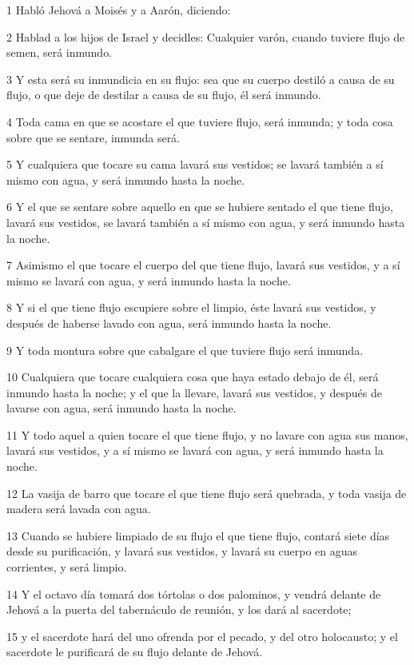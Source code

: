 \par 1 Habló Jehová a Moisés y a Aarón, diciendo:
\par 2 Hablad a los hijos de Israel y decidles: Cualquier varón, cuando tuviere flujo de semen, será inmundo.
\par 3 Y esta será su inmundicia en su flujo: sea que su cuerpo destiló a causa de su flujo, o que deje de destilar a causa de su flujo, él será inmundo.
\par 4 Toda cama en que se acostare el que tuviere flujo, será inmunda; y toda cosa sobre que se sentare, inmunda será.
\par 5 Y cualquiera que tocare su cama lavará sus vestidos; se lavará también a sí mismo con agua, y será inmundo hasta la noche.
\par 6 Y el que se sentare sobre aquello en que se hubiere sentado el que tiene flujo, lavará sus vestidos, se lavará también a sí mismo con agua, y será inmundo hasta la noche.
\par 7 Asimismo el que tocare el cuerpo del que tiene flujo, lavará sus vestidos, y a sí mismo se lavará con agua, y será inmundo hasta la noche.
\par 8 Y si el que tiene flujo escupiere sobre el limpio, éste lavará sus vestidos, y después de haberse lavado con agua, será inmundo hasta la noche.
\par 9 Y toda montura sobre que cabalgare el que tuviere flujo será inmunda.
\par 10 Cualquiera que tocare cualquiera cosa que haya estado debajo de él, será inmundo hasta la noche; y el que la llevare, lavará sus vestidos, y después de lavarse con agua, será inmundo hasta la noche.
\par 11 Y todo aquel a quien tocare el que tiene flujo, y no lavare con agua sus manos, lavará sus vestidos, y a sí mismo se lavará con agua, y será inmundo hasta la noche.
\par 12 La vasija de barro que tocare el que tiene flujo será quebrada, y toda vasija de madera será lavada con agua.
\par 13 Cuando se hubiere limpiado de su flujo el que tiene flujo, contará siete días desde su purificación, y lavará sus vestidos, y lavará su cuerpo en aguas corrientes, y será limpio.
\par 14 Y el octavo día tomará dos tórtolas o dos palominos, y vendrá delante de Jehová a la puerta del tabernáculo de reunión, y los dará al sacerdote;
\par 15 y el sacerdote hará del uno ofrenda por el pecado, y del otro holocausto; y el sacerdote le purificará de su flujo delante de Jehová.
